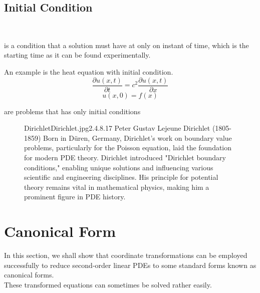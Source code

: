 \documentclass[]{article}
\begin{document}
\subsection{Initial Condition}
\
\begin{definition}
    is a condition that a solution must have at only on instant of time, which is the starting time as it can be found experimentally.
\end{definition}
An example is the heat equation with initial condition.
\[
    \frac{\partial u(x,t)}{\partial t}  = c^2 \frac{\partial u(x,t)}{\partial x}
\]
\[
    u(x,0) = f(x)
\]
\begin{definition}
    are problems that has only initial conditions
\end{definition}
\begin{figure}[b]
    \begin{enrichment}{Dirichlet}{Dirichlet.jpg}{2.4}{.8}{.17}
        Peter Gustav Lejeune Dirichlet (1805-1859)  Born in Düren, Germany, Dirichlet's work on boundary value problems, particularly for the Poisson equation, laid the foundation for modern PDE theory. Dirichlet introduced "Dirichlet boundary conditions," enabling unique solutions and influencing various scientific and engineering disciplines. His principle for potential theory remains vital in mathematical physics, making him a prominent figure in PDE history.
    \end{enrichment}
\end{figure}

\section{Canonical Form}
In this section, we shall show that coordinate transformations can be employed successfully to reduce second-order linear PDEs to some standard forms known as canonical forms. 
\\
These transformed equations can sometimes be solved rather easily.
\end{document}

